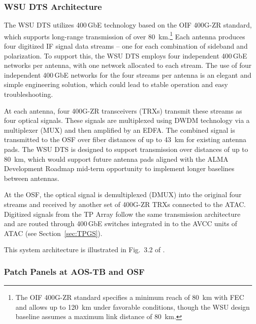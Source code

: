 \subsubsection{WSU DTS Architecture}
The \ac{WSU} \ac{DTS} utilizes 400\,GbE technology based on the \ac{OIF} 400G-ZR standard, which supports long-range transmission of over 80~km.\footnote{The \ac{OIF} 400G-ZR standard specifies a minimum reach of 80~km with \ac{FEC} and allows up to 120~km under favorable conditions, though the \ac{WSU} design baseline assumes a maximum link distance of 80~km.}
Each antenna produces four digitized \ac{IF} signal data streams -- one for each combination of sideband and polarization.
To support this, the \ac{WSU} \ac{DTS} employs four independent 400\,GbE networks per antenna, with one network allocated to each stream.
The use of four independent 400\,GbE networks for the four streams per antenna is an elegant and simple engineering solution, which could lead to stable operation and easy troubleshooting.

At each antenna, four 400G-ZR transceivers (TRXs) transmit these streams as four optical signals.
These signals are multiplexed using \ac{DWDM} technology via a multiplexer (MUX) and then amplified by an \ac{EDFA}.
The combined signal is transmitted to the \ac{OSF} over fiber distances of up to 43~km for existing antenna pads.
The \ac{WSU} \ac{DTS} is designed to support transmission over distances of up to 80~km, which would support future antenna pads aligned with the \ac{ALMA} Development Roadmap mid-term opportunity to implement longer baselines between antennas.

At the \ac{OSF}, the optical signal is demultiplexed (DMUX) into the original four streams and received by another set of 400G-ZR TRXs connected to the \ac{ATAC}.
Digitized signals from the \ac{TP} Array follow the same transmission architecture and are routed through 400\,GbE switches integrated in to the \ac{AVCC} units of \ac{ATAC} (see Section~\ref{sec:TPGS}).

This system architecture is illustrated in Fig.~3.2 of \cite{dts_pdr_dsn}.


\subsubsection{Patch Panels at AOS-TB and OSF}
\label{sec:PatchPanel}


